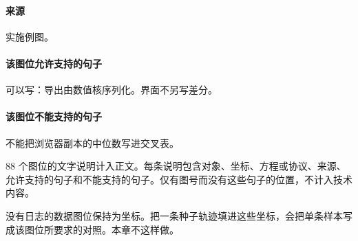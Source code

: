 \paragraph{来源}
实施例图。

\paragraph{该图位允许支持的句子}
可以写：导出由数值核序列化。界面不另写差分。

\paragraph{该图位不能支持的句子}
不能把浏览器副本的中位数写进交叉表。


88 个图位的文字说明计入正文。每条说明包含对象、坐标、方程或协议、来源、允许支持的句子和不能支持的句子。仅有图号而没有这些句子的位置，不计入技术内容。

没有日志的数据图位保持为坐标。把一条种子轨迹填进这些坐标，会把单条样本写成该图位所要求的对照。本章不这样做。
